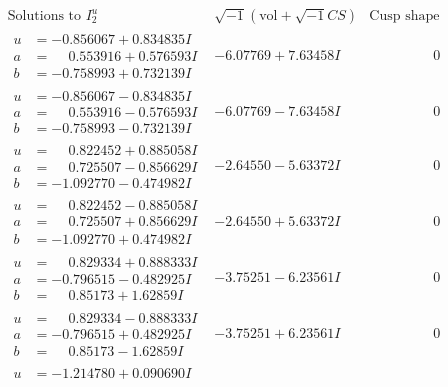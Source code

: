 \documentclass[1p]{elsarticle_modified}
\theoremstyle{definition}
\newcommand{\I}{\sqrt{-1}}
\begin{document}
$$\begin{array}{c|c|c}
\text{Solutions to }I^u_{2}& \I (\text{vol} + \sqrt{-1}CS) & \text{Cusp shape}\\
 \hline 
\begin{aligned}
u &= -0.856067 + 0.834835 I \\
a &= \phantom{-}0.553916 + 0.576593 I \\
b &= -0.758993 + 0.732139 I\end{aligned}
 & -6.07769 + 7.63458 I & \phantom{-0.000000 } 0 \\ \hline\begin{aligned}
u &= -0.856067 - 0.834835 I \\
a &= \phantom{-}0.553916 - 0.576593 I \\
b &= -0.758993 - 0.732139 I\end{aligned}
 & -6.07769 - 7.63458 I & \phantom{-0.000000 } 0 \\ \hline\begin{aligned}
u &= \phantom{-}0.822452 + 0.885058 I \\
a &= \phantom{-}0.725507 - 0.856629 I \\
b &= -1.092770 - 0.474982 I\end{aligned}
 & -2.64550 - 5.63372 I & \phantom{-0.000000 } 0 \\ \hline\begin{aligned}
u &= \phantom{-}0.822452 - 0.885058 I \\
a &= \phantom{-}0.725507 + 0.856629 I \\
b &= -1.092770 + 0.474982 I\end{aligned}
 & -2.64550 + 5.63372 I & \phantom{-0.000000 } 0 \\ \hline\begin{aligned}
u &= \phantom{-}0.829334 + 0.888333 I \\
a &= -0.796515 - 0.482925 I \\
b &= \phantom{-}0.85173 + 1.62859 I\end{aligned}
 & -3.75251 - 6.23561 I & \phantom{-0.000000 } 0 \\ \hline\begin{aligned}
u &= \phantom{-}0.829334 - 0.888333 I \\
a &= -0.796515 + 0.482925 I \\
b &= \phantom{-}0.85173 - 1.62859 I\end{aligned}
 & -3.75251 + 6.23561 I & \phantom{-0.000000 } 0 \\ \hline\begin{aligned}
u &= -1.214780 + 0.090690 I \\

\end{aligned}
\end{array}$$
\end{document}
